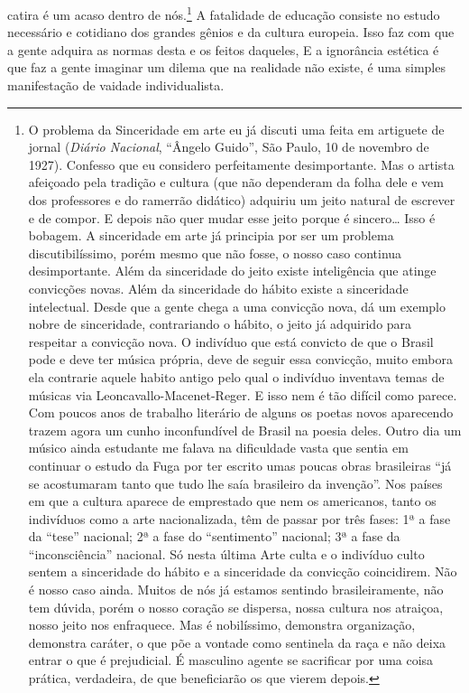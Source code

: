 catira é um acaso dentro de nós.\footnote{O problema da Sinceridade em arte eu já discuti uma feita em artiguete de jornal (\textit{Diário Nacional}, ``Ângelo Guido'', São Paulo, 10 de novembro de 1927). Confesso que eu considero perfeitamente desimportante. Mas o artista afeiçoado pela tradição e cultura (que não dependeram da folha dele e vem dos professores e do ramerrão didático) adquiriu um jeito natural de escrever e de compor. E depois não quer mudar esse jeito porque é sincero\ldots{} Isso é bobagem. A sinceridade em arte já principia por ser um problema discutibilíssimo, porém mesmo que não fosse, o nosso caso continua desimportante.
Além da sinceridade do jeito existe inteligência que atinge convicções novas. Além da sinceridade do hábito existe a sinceridade intelectual. Desde que a gente chega a uma convicção nova, dá um exemplo nobre de sinceridade, contrariando o hábito, o jeito já adquirido para respeitar a convicção nova. O indivíduo que está convicto de que o Brasil pode e deve ter música própria, deve de seguir essa convicção, muito embora ela contrarie aquele habito antigo pelo qual o indivíduo inventava temas de músicas via Leoncavallo-Macenet-Reger. E isso nem é tão difícil como parece. Com poucos anos de trabalho literário de alguns os poetas novos aparecendo trazem agora um cunho inconfundível de Brasil na poesia deles. Outro dia um músico ainda estudante me falava na dificuldade vasta que sentia em continuar o estudo da Fuga por ter escrito umas poucas obras brasileiras ``já se acostumaram tanto que tudo lhe saía brasileiro da invenção''. Nos países em que a cultura aparece de emprestado que nem os americanos, tanto os indivíduos como a arte nacionalizada, têm de passar por três fases: 1ª a fase da ``tese'' nacional; 2ª a fase do ``sentimento'' nacional; 3ª a fase da ``inconsciência'' nacional. Só nesta última Arte culta e o indivíduo culto sentem a sinceridade do hábito e a sinceridade da convicção coincidirem. Não é nosso caso ainda. Muitos de nós já estamos sentindo brasileiramente, não tem dúvida, porém o nosso coração se dispersa, nossa cultura nos atraiçoa, nosso jeito nos enfraquece. Mas é nobilíssimo, demonstra organização, demonstra caráter, o que põe a vontade como sentinela da raça e não deixa entrar o que é prejudicial. É masculino agente se sacrificar por uma coisa prática, verdadeira, de que beneficiarão os que vierem depois.} A fatalidade de
educação consiste no estudo necessário e cotidiano dos grandes gênios e
da cultura europeia. Isso faz com que a gente adquira as normas desta e
os feitos daqueles, E a ignorância estética é que faz a gente imaginar
um dilema que na realidade não existe, é uma simples manifestação de
vaidade individualista.


